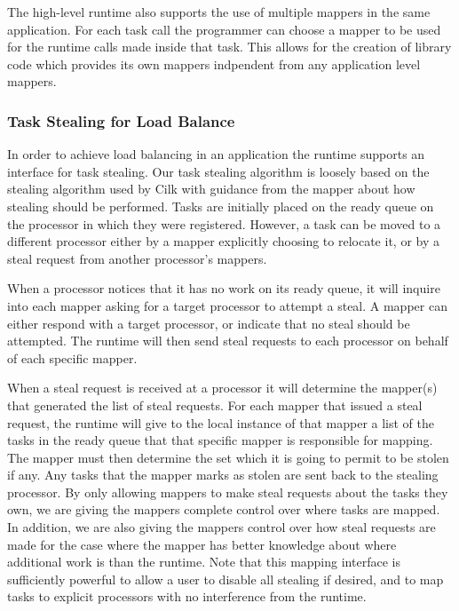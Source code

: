 The high-level runtime also supports the use of multiple mappers in the same application.  For each task 
call the programmer can choose a mapper to be used for the runtime calls made inside that
task.  This allows for the creation of library code which provides its own mappers indpendent
from any application level mappers.

\subsubsection{Task Stealing for Load Balance}
\label{subsec:steal}
In order to achieve load balancing in an application the runtime supports an interface
for task stealing.  Our task stealing algorithm is loosely based on the stealing algorithm
used by Cilk \cite{CILK95} with guidance from the mapper about how stealing should be
performed.  Tasks are initially placed on the ready queue on the processor in which they
were registered.  However, a task can be moved to a different processor either by a mapper
explicitly choosing to relocate it, or by a steal request from another processor's mappers.

When a processor notices that it has no work on its ready queue, it will inquire into each
mapper asking for a target processor to attempt a steal.  A mapper can either respond with
a target processor, or indicate that no steal should be attempted.  The runtime will then
send steal requests to each processor on behalf of each specific mapper.  

When a steal request is received at a processor it will determine the mapper(s) that generated
the list of steal requests.  For each mapper that issued a steal request, the runtime will
give to the local instance of that mapper a list of the tasks in the ready queue that that
specific mapper is responsible for mapping.  The mapper must then determine the set which
it is going to permit to be stolen if any.  Any tasks that the mapper marks as stolen are
sent back to the stealing processor.  By only allowing mappers to make steal requests about
the tasks they own, we are giving the mappers complete control over where tasks are mapped.
In addition, we are also giving the mappers control over how steal requests are made for
the case where the mapper has better knowledge about where additional work is than the 
runtime.  Note that this mapping interface is sufficiently powerful to allow a user to
disable all stealing if desired, and to map tasks to explicit processors with no interference
from the runtime.

